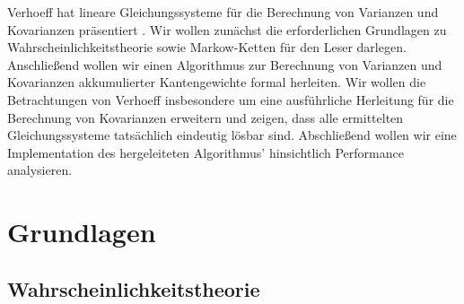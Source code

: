 \documentclass[a4paper]{article}
\newcommand{\mc}{Markow-Kette}
\theoremstyle{nonumberplain}
\begin{document}
Verhoeff hat lineare Gleichungssysteme für die Berechnung von Varianzen und Kovarianzen präsentiert \cite{Verh04}. Wir wollen zunächst die erforderlichen Grundlagen zu Wahrscheinlichkeitstheorie sowie \mc{}n für den Leser darlegen. Anschließend wollen wir einen Algorithmus zur Berechnung von Varianzen und Kovarianzen akkumulierter Kantengewichte formal herleiten. Wir wollen  die Betrachtungen von Verhoeff insbesondere um eine ausführliche Herleitung für die Berechnung von Kovarianzen erweitern und zeigen, dass alle ermittelten Gleichungssysteme tatsächlich eindeutig lösbar sind. Abschließend wollen wir eine Implementation des hergeleiteten Algorithmus' hinsichtlich Performance analysieren.

\section{Grundlagen}

\subsection{Wahrscheinlichkeitstheorie}
\end{document}
